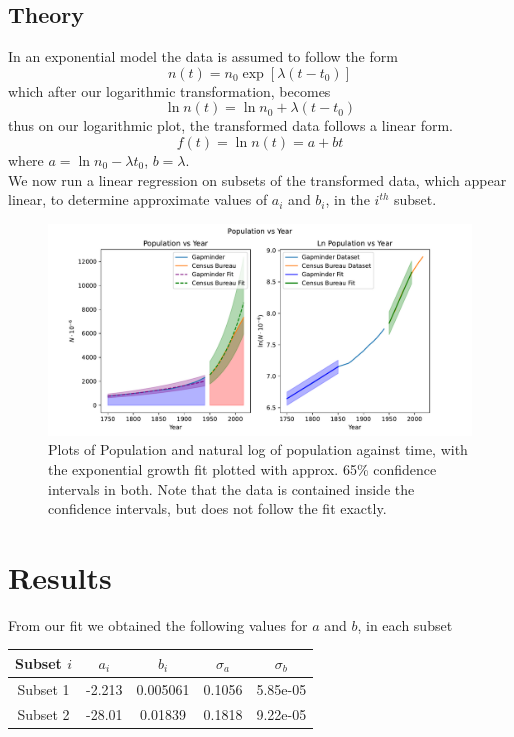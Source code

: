 \documentclass{article}
\theoremstyle{definition}
\theoremstyle{remark}
\begin{document}
\subsection{Theory} 
In an exponential model the data is assumed to follow the form
\begin{equation}
    n(t) = n_0 \exp{[\lambda (t-t_0)]}
\end{equation}
which after our logarithmic transformation, becomes
\begin{equation}
    \ln{n(t)} = \ln{n_0} + \lambda (t-t_0)
\end{equation}
thus on our logarithmic plot, the transformed data follows a linear form.
\begin{equation}
    f(t) = \ln{n(t)} = a + b t
\end{equation}
where $a = \ln{n_0} - \lambda t_0$, $b = \lambda$.\\
\indent We now run a linear regression on subsets of the transformed data, which appear linear, to determine approximate values of $a_i$ and $b_i$, in the $i^{th}$ subset.\\
\begin{figure}[H]
    \centering
    \includegraphics[width=\textwidth]{population_growth.pdf}
    \caption{\label{fig: Logarithmicplot} Plots of Population and natural log of population against time, with the exponential growth fit plotted with approx. 65\% confidence intervals in both. Note that the data is contained inside the confidence intervals, but does not follow the fit exactly.}
\end{figure}
\section{Results}
From our fit we obtained the following values for $a$ and $b$, in each subset\\

\begin{center}
\begin{tabular}{c|c|c|c|c}
    \hline
    \hline
    Subset $i$ & $a_i$ & $b_i$ & $\sigma_{a}$ & $\sigma_{b}$ \\ 
    \hline
    Subset 1 & -2.213 & 0.005061 & 0.1056 & 5.85e-05 \\ 
    Subset 2 & -28.01 & 0.01839 & 0.1818 & 9.22e-05 \\
    \hline
    \hline
\end{tabular}
\end{center}
\end{document}
